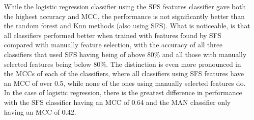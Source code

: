 While the logistic regression classifier using the SFS features classifier gave both the highest accuracy and MCC, the performance is not significantly better than the random forest and Knn methods (also using SFS). What is noticeable, is that all classifiers performed better when trained with features found by SFS compared with manually feature selection, with the accuracy of all three classifiers that used SFS having being of above 80\% and all those with manually selected features being below 80\%. The distinction is even more pronounced in the MCCs of each of the classifiers, where all classifiers using SFS features have an MCC of over 0.5, while none of the ones using manually selected features do. In the case of logistic regression, there is the greatest difference in performance with the SFS classifier having an MCC of 0.64 and the MAN classifier only having an MCC of 0.42. 

%
\childMat

